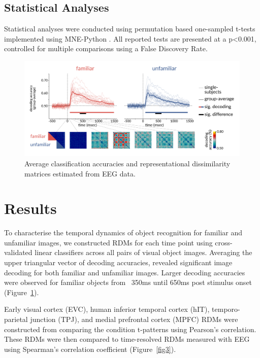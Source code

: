\documentclass[10pt,letterpaper]{article}
\begin{document}
\subsection{Statistical Analyses}

Statistical analyses were conducted using permutation based one-sampled t-tests
implemented using MNE-Python \cite{Gramfort2013-tl}. All reported tests are
presented at a p\textless0.001, controlled for multiple comparisons using a False
Discovery Rate.

\begin{figure}[ht]
  \begin{center}
  \includegraphics[width=\linewidth]{figures/figure2.png}
  \end{center}
  \caption{
    Average classification accuracies and representational dissimilarity
    matrices estimated from EEG data.
  } 
  \label{fig2}
  \end{figure}

\section{Results}

To characterise the temporal dynamics of object recognition for familiar and
unfamiliar images, we constructed RDMs for each time point using cross-validated
linear classifiers across all pairs of visual object images. Averaging the upper
triangular vector of decoding accuracies, revealed significant image decoding
for both familiar and unfamiliar images. Larger decoding accuracies were
observed for familiar objects from ~350ms until 650ms post stimulus onset
(Figure~\ref{fig2}). 

Early visual cortex (EVC), human inferior temporal cortex (hIT),
temporo-parietal junction (TPJ), and medial prefrontal cortex (MPFC) RDMs were
constructed from comparing the condition t-patterns using Pearson’s correlation.
These RDMs were then compared to time-resolved RDMs measured with EEG using
Spearman’s correlation coefficient (Figure~\ref{fig3}). 
\end{document}
